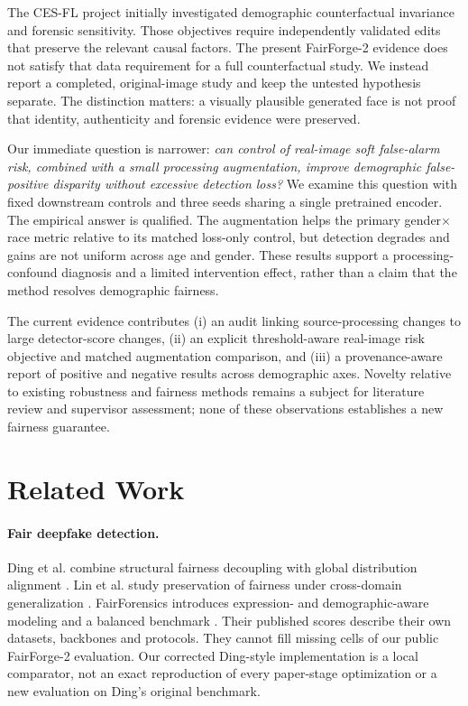 \documentclass[10pt,twocolumn,letterpaper]{article}
\begin{document}
The CES-FL project initially investigated demographic counterfactual invariance and forensic sensitivity.
Those objectives require independently validated edits that preserve the relevant causal factors.
The present FairForge-2 evidence does not satisfy that data requirement for a full counterfactual study.
We instead report a completed, original-image study and keep the untested hypothesis separate.
The distinction matters: a visually plausible generated face is not proof that identity, authenticity
and forensic evidence were preserved.

Our immediate question is narrower: \emph{can control of real-image soft false-alarm risk, combined with a
small processing augmentation, improve demographic false-positive disparity without excessive detection loss?}
We examine this question with fixed downstream controls and three seeds sharing a single pretrained encoder.
The empirical answer is qualified. The augmentation helps the primary gender$\times$race metric relative to its
matched loss-only control, but detection degrades and gains are not uniform across age and gender.
These results support a processing-confound diagnosis and a limited intervention effect, rather than a claim
that the method resolves demographic fairness.

The current evidence contributes (i) an audit linking source-processing changes to large detector-score changes,
(ii) an explicit threshold-aware real-image risk objective and matched augmentation comparison,
and (iii) a provenance-aware report of positive and negative results across demographic axes.
Novelty relative to existing robustness and fairness methods remains a subject for literature review and
supervisor assessment; none of these observations establishes a new fairness guarantee.

\section{Related Work}
\paragraph{Fair deepfake detection.}
Ding et al. combine structural fairness decoupling with global distribution alignment \cite{ding2025}.
Lin et al. study preservation of fairness under cross-domain generalization \cite{lin2024}.
FairForensics introduces expression- and demographic-aware modeling and a balanced benchmark \cite{zhang2026}.
Their published scores describe their own datasets, backbones and protocols. They cannot fill missing cells
of our public FairForge-2 evaluation. Our corrected Ding-style implementation is a local comparator, not
an exact reproduction of every paper-stage optimization or a new evaluation on Ding's original benchmark.
\end{document}
